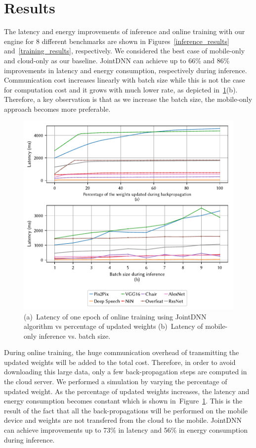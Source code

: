 \section{Results}

The latency and energy improvements of inference and online training with our engine for 8 different benchmarks are shown in Figures~\ref{inference_results} and~\ref{training_results},  respectively. We considered the best case of mobile-only and cloud-only as our baseline. JointDNN can achieve up to 66\% and 86\% improvements in latency and energy consumption, respectively during inference. Communication cost increases linearly with batch size while this is not the case for computation cost and it grows with much lower rate, as depicted in~\ref{weights_changed}(b). Therefore, a key observation is that as we increase the batch size, the mobile-only approach becomes more preferable. 


\begin{figure}[b]
\includegraphics[width=\linewidth]{training_weights_results}
\caption{(a)~Latency of one epoch of online training using JointDNN algorithm vs percentage of updated weights (b)~Latency of mobile-only inference vs. batch size.}\label{weights_changed}
\end{figure}

During online training, the huge communication overhead of transmitting the updated weights will be added to the total cost. Therefore, in order to avoid downloading this large data, only a few back-propagation steps are computed in the cloud server. We performed a simulation by varying the percentage of updated weight. As the percentage of updated weights increases, the latency and energy consumption becomes constant which is shown in~Figure~\ref{weights_changed}. This is the  result of the fact that all the back-propagations will be performed on the mobile device and weights are not transfered from the cloud to the mobile. JointDNN can achieve improvements up to 73\% in latency and 56\% in energy consumption during inference.

